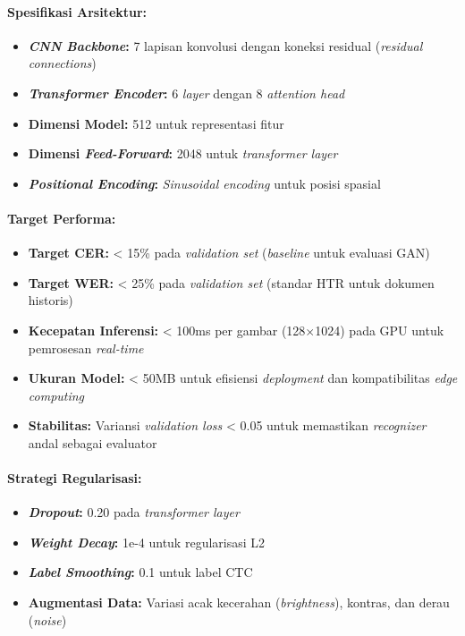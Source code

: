 \documentclass[12pt,a4paper]{article}
\begin{document}
\paragraph{Spesifikasi Arsitektur:}
\begin{itemize}[leftmargin=*, nosep]
\item \textbf{\textit{CNN Backbone}:} 7 lapisan konvolusi dengan koneksi residual (\textit{residual connections})
\item \textbf{\textit{Transformer Encoder}:} 6 \textit{layer} dengan 8 \textit{attention head}
\item \textbf{Dimensi Model:} 512 untuk representasi fitur
\item \textbf{Dimensi \textit{Feed-Forward}:} 2048 untuk \textit{transformer layer}
\item \textbf{\textit{Positional Encoding}:} \textit{Sinusoidal encoding} untuk posisi spasial
\end{itemize}

\paragraph{Target Performa:}
\begin{itemize}[leftmargin=*, nosep]
\item \textbf{Target CER:} < 15\% pada \textit{validation set} (\textit{baseline} untuk evaluasi GAN)
\item \textbf{Target WER:} < 25\% pada \textit{validation set} (standar HTR untuk dokumen historis)
\item \textbf{Kecepatan Inferensi:} < 100ms per gambar (128$\times$1024) pada GPU untuk pemrosesan \textit{real-time}
\item \textbf{Ukuran Model:} < 50MB untuk efisiensi \textit{deployment} dan kompatibilitas \textit{edge computing}
\item \textbf{Stabilitas:} Variansi \textit{validation loss} < 0.05 untuk memastikan \textit{recognizer} andal sebagai evaluator
\end{itemize}

\paragraph{Strategi Regularisasi:}
\begin{itemize}[leftmargin=*, nosep]
\item \textbf{\textit{Dropout}:} 0.20 pada \textit{transformer layer}
\item \textbf{\textit{Weight Decay}:} 1e-4 untuk regularisasi L2
\item \textbf{\textit{Label Smoothing}:} 0.1 untuk label CTC
\item \textbf{Augmentasi Data:} Variasi acak kecerahan (\textit{brightness}), kontras, dan derau (\textit{noise})
\end{itemize}
\end{document}
